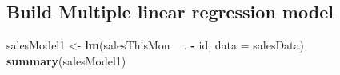 \documentclass[
]{article}
\newenvironment{Shaded}{\begin{snugshade}}{\end{snugshade}}
\newcommand{\DataTypeTok}[1]{\textcolor[rgb]{0.13,0.29,0.53}{#1}}
\newcommand{\KeywordTok}[1]{\textcolor[rgb]{0.13,0.29,0.53}{\textbf{#1}}}
\newcommand{\NormalTok}[1]{#1}
\newcommand{\OperatorTok}[1]{\textcolor[rgb]{0.81,0.36,0.00}{\textbf{#1}}}
\newcommand{\StringTok}[1]{\textcolor[rgb]{0.31,0.60,0.02}{#1}}
\begin{document}
\hypertarget{build-multiple-linear-regression-model}{%
\subsection{Build Multiple linear regression
model}\label{build-multiple-linear-regression-model}}

\begin{Shaded}
\begin{Highlighting}[]
\NormalTok{salesModel1 <-}\StringTok{ }\KeywordTok{lm}\NormalTok{(salesThisMon }\OperatorTok{~}\StringTok{ }\NormalTok{. }\OperatorTok{-}\StringTok{ }\NormalTok{id, }
                 \DataTypeTok{data =}\NormalTok{ salesData)}
\KeywordTok{summary}\NormalTok{(salesModel1)}
\end{Highlighting}
\end{Shaded}
\end{document}

